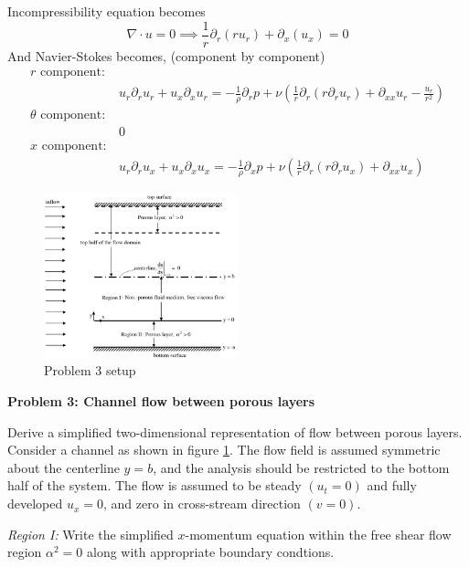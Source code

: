 \documentclass[11pt]{article}
\begin{document}
Incompressibility equation becomes
\begin{equation}
  \nabla \cdot u = 0 \implies \frac{1}{r} \partial_r(ru_r) + \partial_x(u_x) = 0
\end{equation}
And Navier-Stokes becomes, (component by component)
\begin{align}
  r \text{ component}:&\\
                      &u_r \partial_r u_r + u_x \partial_xu_r = -\frac{1}{\rho}\partial_rp + \nu \left(\frac{1}{r}\partial_r(r\partial_r u_r) + \partial_{xx}u_r - \frac{u_r}{r^2}\right)\\
  \theta \text{ component}:&\\
                      &0\\
  x \text{ component}:&\\
                      &u_r\partial_ru_x + u_x\partial_xu_x = -\frac{1}{\rho}\partial_xp + \nu \left(\frac{1}{r}\partial_r(r\partial_ru_x)+\partial_{xx}u_x\right)
\end{align}
\newpage

\begin{figure}
  \centering
  \includegraphics[width=0.5\textwidth]{prob3.png}
  \caption{Problem 3 setup}
  \label{fig:prob3}
\end{figure}

\textbf{Problem 3: Channel flow between porous layers}

Derive a simplified two-dimensional representation of flow between porous layers. Consider a channel as shown in figure \ref{fig:prob3}. The flow field is assumed symmetric about the centerline $y=b$, and the analysis should be restricted to the bottom half of the system. The flow is assumed to be steady $(u_t = 0)$ and fully developed $u_x = 0$, and zero in cross-stream direction $(v=0)$.

\textit{Region I:} Write the simplified $x$-momentum equation within the free shear flow region $\alpha^2 = 0$ along with appropriate boundary condtions.
\end{document}
